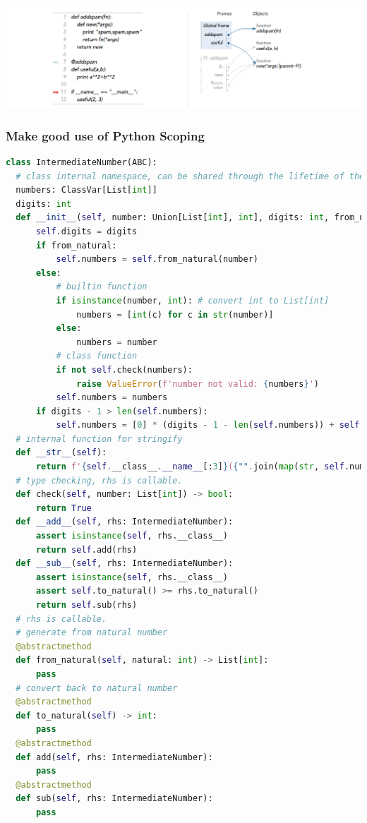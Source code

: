 \documentclass[a4paper]{article}
\theoremstyle{definition}
\begin{document}
\includegraphics[width=15cm]{./img/b5674ca16f72af11d7a1c70602fbfe10_b.png}



\subsubsection{Make good use of Python Scoping}
\begin{lstlisting}[language=Python]
class IntermediateNumber(ABC):
  # class internal namespace, can be shared through the lifetime of the class
  numbers: ClassVar[List[int]]
  digits: int
  def __init__(self, number: Union[List[int], int], digits: int, from_natural: bool):
      self.digits = digits
      if from_natural:
          self.numbers = self.from_natural(number)
      else:
          # builtin function
          if isinstance(number, int): # convert int to List[int]
              numbers = [int(c) for c in str(number)]
          else:
              numbers = number
          # class function
          if not self.check(numbers):
              raise ValueError(f'number not valid: {numbers}')
          self.numbers = numbers
      if digits - 1 > len(self.numbers):
          self.numbers = [0] * (digits - 1 - len(self.numbers)) + self.numbers
  # internal function for stringify
  def __str__(self):
      return f'{self.__class__.__name__[:3]}({"".join(map(str, self.numbers))}){self.custom_str()}'
  # type checking, rhs is callable.
  def check(self, number: List[int]) -> bool:
      return True
  def __add__(self, rhs: IntermediateNumber):
      assert isinstance(self, rhs.__class__)
      return self.add(rhs)
  def __sub__(self, rhs: IntermediateNumber):
      assert isinstance(self, rhs.__class__)
      assert self.to_natural() >= rhs.to_natural()
      return self.sub(rhs)
  # rhs is callable.
  # generate from natural number
  @abstractmethod
  def from_natural(self, natural: int) -> List[int]:
      pass
  # convert back to natural number
  @abstractmethod
  def to_natural(self) -> int:
      pass
  @abstractmethod
  def add(self, rhs: IntermediateNumber):
      pass
  @abstractmethod
  def sub(self, rhs: IntermediateNumber):
      pass
\end{lstlisting}
\end{document}
